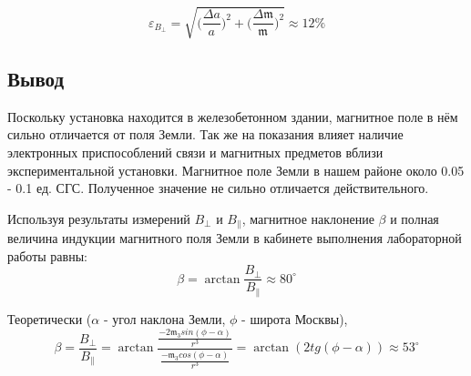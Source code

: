 \documentclass[a4paper,12pt]{article}
\begin{document}
\[\varepsilon_{B_{\perp}} = \sqrt{\Big(\frac{\Delta a}a\Big)^2 + \Big(\frac{\Delta \mathfrak{m}}{\mathfrak{m}}\Big)^2} \approx 12 \%\]


\subsection{Вывод}
Поскольку  установка находится в железобетонном
здании, магнитное поле в нём сильно отличается от поля Земли. Так же на
показания влияет наличие электронных приспособлений связи и магнитных предметов вблизи экспериментальной установки. Магнитное
поле Земли в нашем районе около 0.05 - 0.1 ед. СГС. Полученное значение не сильно отличается действительного.

Используя результаты измерений $B_{\perp}$ и $B_{\|}$, магнитное наклонение $\beta$ и полная величина индукции магнитного поля Земли в кабинете выполнения лабораторной работы равны:
$$\beta = \arctan{\frac{B_{\perp}}{B_{\|}}} \approx 80^{\circ}  $$

Теоретически ($\alpha$ - угол наклона Земли, $\phi$ - широта Москвы),
\[\beta = \frac{B_{\perp}}{B_{\|}} = \arctan\frac{\frac{-2\mathfrak{m}_3sin(\phi-\alpha)}{r^3}}{\frac{-\mathfrak{m}_3cos(\phi-\alpha)}{r^3}} = \arctan(2 tg(\phi - \alpha)) \approx 53^{\circ}\]
\end{document}
